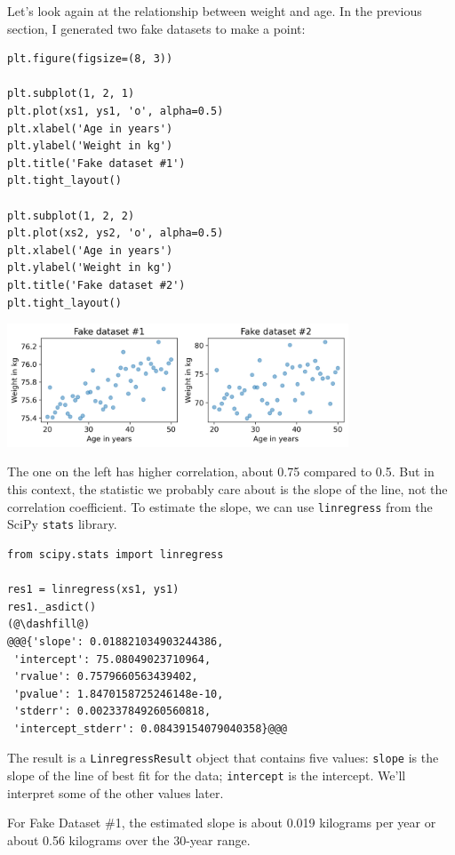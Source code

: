 Let's look again at the relationship between weight and age. In the
previous section, I generated two fake datasets to make a point:

\begin{lstlisting}[]
plt.figure(figsize=(8, 3))

plt.subplot(1, 2, 1)
plt.plot(xs1, ys1, 'o', alpha=0.5)
plt.xlabel('Age in years')
plt.ylabel('Weight in kg')
plt.title('Fake dataset #1')
plt.tight_layout()

plt.subplot(1, 2, 2)
plt.plot(xs2, ys2, 'o', alpha=0.5)
plt.xlabel('Age in years')
plt.ylabel('Weight in kg')
plt.title('Fake dataset #2')
plt.tight_layout()
\end{lstlisting}

\begin{center}
\includegraphics[width=4in]{chapters/09_relationships_files/09_relationships_77_0.png}
\end{center}

The one on the left has higher correlation, about 0.75 compared to 0.5.
But in this context, the statistic we probably care about is the slope
of the line, not the correlation coefficient. To estimate the slope, we
can use \passthrough{\lstinline!linregress!} from the SciPy
\passthrough{\lstinline!stats!} library.

\begin{lstlisting}[]
from scipy.stats import linregress

res1 = linregress(xs1, ys1)
res1._asdict()
(@\dashfill@)
@@@{'slope': 0.018821034903244386,
 'intercept': 75.08049023710964,
 'rvalue': 0.7579660563439402,
 'pvalue': 1.8470158725246148e-10,
 'stderr': 0.002337849260560818,
 'intercept_stderr': 0.08439154079040358}@@@
\end{lstlisting}

The result is a \passthrough{\lstinline!LinregressResult!} object that
contains five values: \passthrough{\lstinline!slope!} is the slope of
the line of best fit for the data; \passthrough{\lstinline!intercept!}
is the intercept. We'll interpret some of the other values later.

For Fake Dataset \#1, the estimated slope is about 0.019 kilograms per
year or about 0.56 kilograms over the 30-year range.

